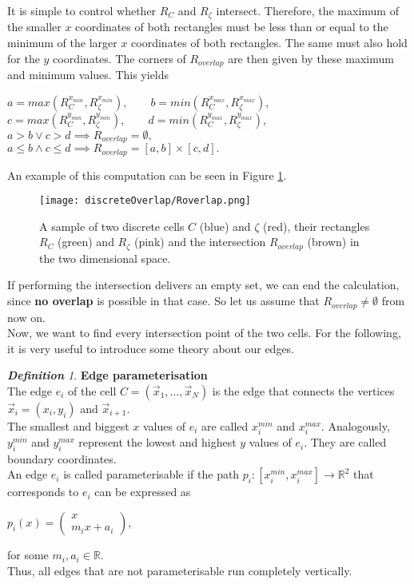 \documentclass[a4paper,12pt,leqno]{article}
\theoremstyle{plain}
\theoremstyle{remark}
\newtheorem{definition}[theorem]{\bf Definition}
\newcommand{\R}{\mathbb{R}}
\begin{document}
It is simple to control whether $R_C$ and $R_\zeta$ intersect. Therefore, the maximum of the smaller $x$ coordinates of both rectangles must be less than or equal to the minimum of the larger $x$ coordinates of both rectangles. The same must also hold for the $y$ coordinates. The corners of $R_{overlap}$ are then given by these maximum and minimum values. This yields
\begin{center}
	$a = max(R_C^{x_{min}}, R_\zeta^{x_{min}}), \qquad b = min(R_C^{x_{max}}, R_\zeta^{x_{max}})$,\\ \smallskip 
	$c = max(R_C^{y_{min}}, R_\zeta^{y_{min}}), \qquad d = min(R_C^{y_{max}}, R_\zeta^{y_{max}})$,\\ \smallskip
	$a > b \lor c > d \implies R_{overlap} = \emptyset,$ \\ \smallskip
	$a \leq b \land c \leq d \implies  R_{overlap} = [a,b]\times[c,d].$ 
\end{center}
An example of this computation can be seen in Figure \ref{fig:rOverlap}.
\begin{figure}[b!]
	\centering 
	\texttt{[image: discreteOverlap/Roverlap.png]}
	\caption{A sample of two discrete cells $C$ (blue) and $\zeta$ (red), their rectangles $R_C$ (green) and $R_\zeta$ (pink) and the intersection $R_{overlap}$ (brown) in the two dimensional space. }
	\label{fig:rOverlap}	
\end{figure}
If performing the intersection delivers an empty set, we can end the calculation, since \textbf{no overlap} is possible in that case. So let us assume that $R_{overlap} \neq \emptyset$ from now on. \\
Now, we want to find every intersection point of the two cells. For the following, it is very useful to introduce some theory about our edges. \\
\begin{definition} \textbf{Edge parameterisation} \label{def:edgeParam}\\
	The edge $e_i$ of the cell $C =  (\vec{x}_1, \ldots, \vec{x}_N)$ is the edge that connects the vertices $\vec{x}_i = (x_i, y_i)$ and $\vec{x}_{i+1}$. \\
	The smallest and biggest $x$ values of $e_i$ are called $x_{i}^{min}$ and $x_{i}^{max}$. Analogously, $y_{i}^{min}$ and $y_{i}^{max}$ represent the lowest and highest $y$ values of $e_i$. They are called boundary coordinates.\\
	An edge $e_i$ is called parameterisable if the path $p_i: [x_{i}^{min}, x_{i}^{max}] \rightarrow \R^2$ that corresponds to $e_i$ can be expressed as
	\begin{center}
		$p_i(x) = \begin{pmatrix}
			x \\ m_i x + a_i 
		\end{pmatrix}$,
	\end{center}
	for some $m_i, a_i \in \R$. \\
	Thus, all edges that are not parameterisable run completely vertically. \\
\end{definition}
\end{document}
